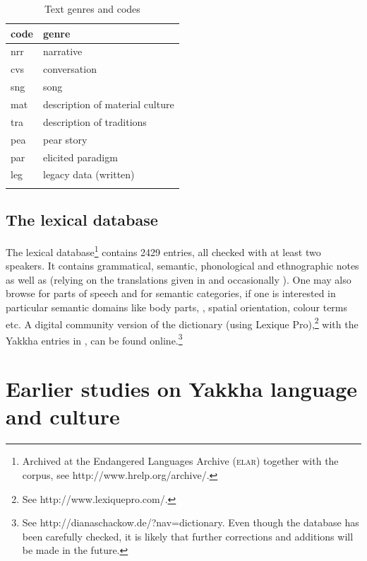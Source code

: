\begin{table}[htp]
\begin{center}
\begin{tabular}{ll}
\lsptoprule
{\sc code}&{\sc genre}\\
\midrule
nrr & narrative \\
cvs & conversation \\
sng & song\\
mat & description of material culture\\
tra & description of traditions\\
pea & pear story\\
par & elicited paradigm\\
leg & legacy data (written)\\
\lspbottomrule
\end{tabular}
\caption{Text genres and codes}\label{tab-genre}
\end{center}
\end{table}


\subsection{The lexical database}

The lexical database\footnote{Archived at the Endangered Languages Archive (\textsc{elar}) together with the corpus, see http://www.hrelp.org/archive/.} contains 2429 entries, all checked with at least two speakers. It contains grammatical, semantic, phonological and ethnographic notes as well as  (relying on the  translations given in \citet{Manandhar2002_Plants} and occasionally \citealt{Turner1931A-Comparative}). One may also browse for parts of speech and for semantic categories, if one is interested in particular semantic domains like body parts, , spatial orientation, colour terms etc. A digital community version of the dictionary (using Lexique Pro),\footnote{See http://www.lexiquepro.com/.} with the Yakkha entries in , can be found online.\footnote{See http://dianaschackow.de/?nav=dictionary. Even though the database has been carefully checked, it is likely that further corrections and additions will be made in the future.}


\section{Earlier studies on Yakkha language and culture}\label{earlier-work}


